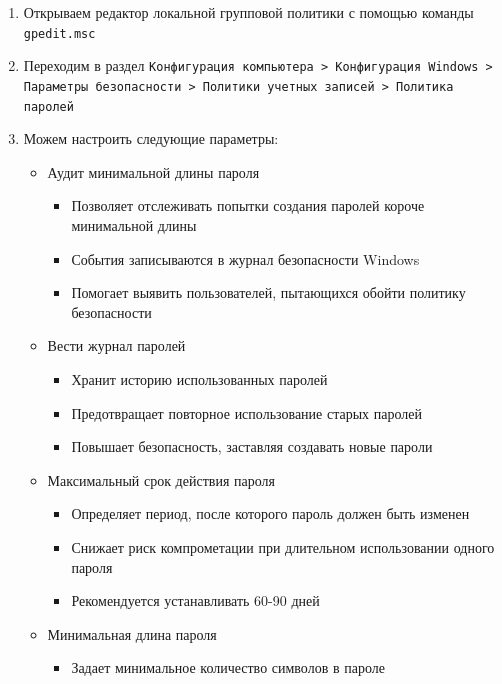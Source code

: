 \documentclass[a4paper, 14pt]{report}
\begin{document}
\begin{enumerate}
    \item Открываем редактор локальной групповой политики с помощью команды \texttt{gpedit.msc}
    \item Переходим в раздел \texttt{Конфигурация компьютера > Конфигурация Windows > Параметры безопасности > Политики учетных записей > Политика паролей}
    \item Можем настроить следующие параметры:
          \begin{itemize}
              \item Аудит минимальной длины пароля
                    \begin{itemize}
                        \item Позволяет отслеживать попытки создания паролей короче минимальной длины
                        \item События записываются в журнал безопасности Windows
                        \item Помогает выявить пользователей, пытающихся обойти политику безопасности
                    \end{itemize}
              \item Вести журнал паролей
                    \begin{itemize}
                        \item Хранит историю использованных паролей
                        \item Предотвращает повторное использование старых паролей
                        \item Повышает безопасность, заставляя создавать новые пароли
                    \end{itemize}
              \item Максимальный срок действия пароля
                    \begin{itemize}
                        \item Определяет период, после которого пароль должен быть изменен
                        \item Снижает риск компрометации при длительном использовании одного пароля
                        \item Рекомендуется устанавливать 60-90 дней
                    \end{itemize}
              \item Минимальная длина пароля
                    \begin{itemize}
                        \item Задает минимальное количество символов в пароле

\end{itemize}
\end{itemize}
\end{enumerate}
\end{document}
